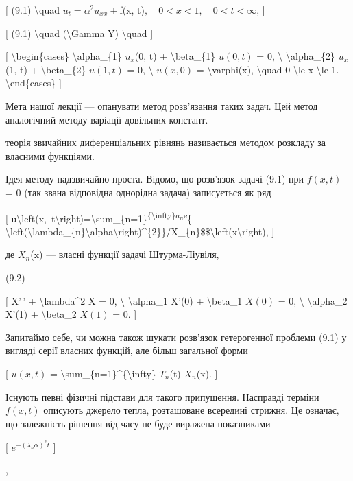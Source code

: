 \documentclass[
]{article}
\begin{document}
{{{[} (9.1) \textbackslash quad \(u_{t} = \alpha^{2} u_{xx} +\)f(x,
t)\(, \quad 0 < x < 1, \quad 0 < t < \infty\), {]}

{[} (9.1) \textbackslash quad (\textbackslash Gamma Y)
\textbackslash quad {]}

{[} \textbackslash begin\{cases\} \textbackslash alpha\_\{1\}
\(u_{x}\)(0, t) + \textbackslash beta\_\{1\} \(u(0, t)\) = 0,
\textbackslash{} \textbackslash alpha\_\{2\} \(u_{x}\)(1, t) +
\textbackslash beta\_\{2\} \(u(1, t)\) = 0, \textbackslash{} \(u(x, 0)\)
= \textbackslash varphi(x), \textbackslash quad 0 \textbackslash le x
\textbackslash le 1. \textbackslash end\{cases\} {]}

Мета нашої лекції --- опанувати метод розв'язання таких задач. Цей метод
аналогічний методу варіації довільних констант.

теорія звичайних диференціальних рівнянь називається методом розкладу за
власними функціями.

Ідея методу надзвичайно проста. Відомо, що розв'язок задачі (9.1) при
\(f(x, t)\) = 0 (так звана відповідна однорідна задача) записується як
ряд

{[}
u\textbackslash left(x,~t\textbackslash right)=\textbackslash sum\_\{n=1\}\textsuperscript{\{\textbackslash infty\}\(a_{n}\)e}\{-\textbackslash left(\textbackslash lambda\_\{n\}\textbackslash alpha\textbackslash right)\^{}\{2\}\}/X\_\{n\}\$\$\textbackslash left(x\textbackslash right),
{]}

де \(X_n\)(x) --- власні функції задачі Штурма-Ліувіля,

(9.2)

{[} X'\,' + \textbackslash lambda\^{}2 X = 0, \textbackslash{}
\textbackslash alpha\_1 X'(0) + \textbackslash beta\_1 \(X(0)\) = 0,
\textbackslash{} \textbackslash alpha\_2 X'(1) + \textbackslash beta\_2
\(X(1)\) = 0. {]}

Запитаймо себе, чи можна також шукати розв'язок гетерогенної проблеми
(9.1) у вигляді серії власних функцій, але більш загальної форми

{[} \(u(x, t)\) =
\textbackslash sum\_\{n=1\}\^{}\{\textbackslash infty\} \(T_n\)(t)
\(X_n\)(x). {]}

Існують певні фізичні підстави для такого припущення. Насправді терміни
\(f(x,t)\) описують джерело тепла, розташоване всередині стрижня. Це
означає, що залежність рішення від часу не буде виражена показниками

{[} \(e^{-(\lambda_n\alpha)^2 t}\) {]}

,

}}
\end{document}
